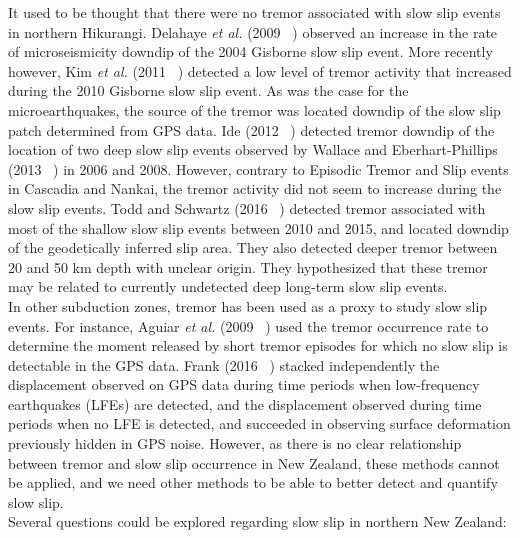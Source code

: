 \documentclass[letterpaper, 12pt]{article}
\begin{document}
It used to be thought that there were no tremor associated with slow slip events in northern Hikurangi. Delahaye \textit{et al.} (2009 ~\cite{DEL_2009}) observed an increase in the rate of microseismicity downdip of the 2004 Gisborne slow slip event. More recently however, Kim \textit{et al.} (2011 ~\cite{KIM_2011}) detected a low level of tremor activity that increased during the 2010 Gisborne slow slip event. As was the case for the microearthquakes, the source of the tremor was located downdip of the slow slip patch determined from GPS data. Ide (2012 ~\cite{IDE_2012}) detected tremor downdip of the location of two deep slow slip events observed by Wallace and Eberhart-Phillips (2013 ~\cite{WAL_2013}) in 2006 and 2008. However, contrary to Episodic Tremor and Slip events in Cascadia and Nankai, the tremor activity did not seem to increase during the slow slip events. Todd and Schwartz (2016 ~\cite{TOD_2016}) detected tremor associated with most of the shallow slow slip events between 2010 and 2015, and located downdip of the geodetically inferred slip area. They also detected deeper tremor between 20 and 50 km depth with unclear origin. They hypothesized that these tremor may be related to currently undetected deep long-term slow slip events.\\

In other subduction zones, tremor has been used as a proxy to study slow slip events. For instance, Aguiar \textit{et al.} (2009 ~\cite{AGU_2009}) used the tremor occurrence rate to determine the moment released by short tremor episodes for which no slow slip is detectable in the GPS data. Frank (2016 ~\cite{FRA_2016}) stacked independently the displacement observed on GPS data during time periods when low-frequency earthquakes (LFEs) are detected, and the displacement observed during time periods when no LFE is detected, and succeeded in observing surface deformation previously hidden in GPS noise. However, as there is no clear relationship between tremor and slow slip occurrence in New Zealand, these methods cannot be applied, and we need other methods to be able to better detect and quantify slow slip.\\

Several questions could be explored regarding slow slip in northern New Zealand:
\end{document}
